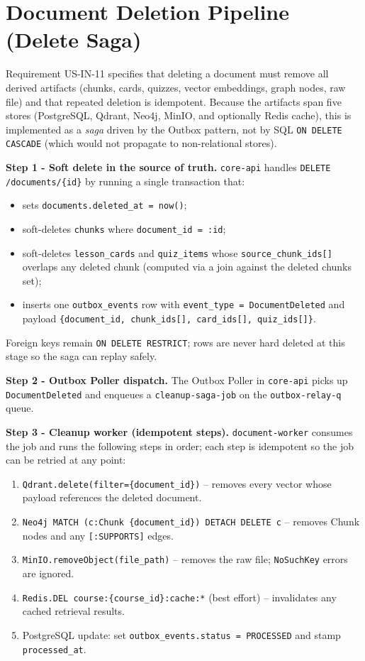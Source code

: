 \section{Document Deletion Pipeline (Delete Saga)}
\label{appendix:delete-saga}

Requirement US-IN-11 specifies that deleting a document must remove all
derived artifacts (chunks, cards, quizzes, vector embeddings, graph
nodes, raw file) and that repeated deletion is idempotent. Because the
artifacts span five stores (PostgreSQL, Qdrant, Neo4j, MinIO, and
optionally Redis cache), this is implemented as a \emph{saga} driven by
the Outbox pattern, not by SQL \texttt{ON DELETE CASCADE} (which would
not propagate to non-relational stores).

\textbf{Step 1 - Soft delete in the source of truth.} \texttt{core-api}
handles \texttt{DELETE /documents/\{id\}} by running a single
transaction that:
\begin{itemize}
    \item sets \texttt{documents.deleted\_at = now()};
    \item soft-deletes \texttt{chunks} where
          \texttt{document\_id = :id};
    \item soft-deletes \texttt{lesson\_cards} and \texttt{quiz\_items}
          whose \texttt{source\_chunk\_ids[]} overlaps any deleted
          chunk (computed via a join against the deleted chunks set);
    \item inserts one \texttt{outbox\_events} row with
          \texttt{event\_type = DocumentDeleted} and payload
          \texttt{\{document\_id, chunk\_ids[], card\_ids[],
          quiz\_ids[]\}}.
\end{itemize}
Foreign keys remain \texttt{ON DELETE RESTRICT}; rows are never hard
deleted at this stage so the saga can replay safely.

\textbf{Step 2 - Outbox Poller dispatch.} The Outbox Poller in
\texttt{core-api} picks up \texttt{DocumentDeleted} and enqueues a
\texttt{cleanup-saga-job} on the \texttt{outbox-relay-q} queue.

\textbf{Step 3 - Cleanup worker (idempotent steps).}
\texttt{document-worker} consumes the job and runs the following steps
in order; each step is idempotent so the job can be retried at any
point:
\begin{enumerate}
    \item \texttt{Qdrant.delete(filter=\{document\_id\})} -- removes
          every vector whose payload references the deleted document.
    \item \texttt{Neo4j MATCH (c:Chunk \{document\_id\}) DETACH DELETE
          c} -- removes Chunk nodes and any \texttt{[:SUPPORTS]} edges.
    \item \texttt{MinIO.removeObject(file\_path)} -- removes the raw
          file; \texttt{NoSuchKey} errors are ignored.
    \item \texttt{Redis.DEL course:\{course\_id\}:cache:*} (best
          effort) -- invalidates any cached retrieval results.
    \item PostgreSQL update: set \texttt{outbox\_events.status =
          PROCESSED} and stamp \texttt{processed\_at}.
\end{enumerate}

